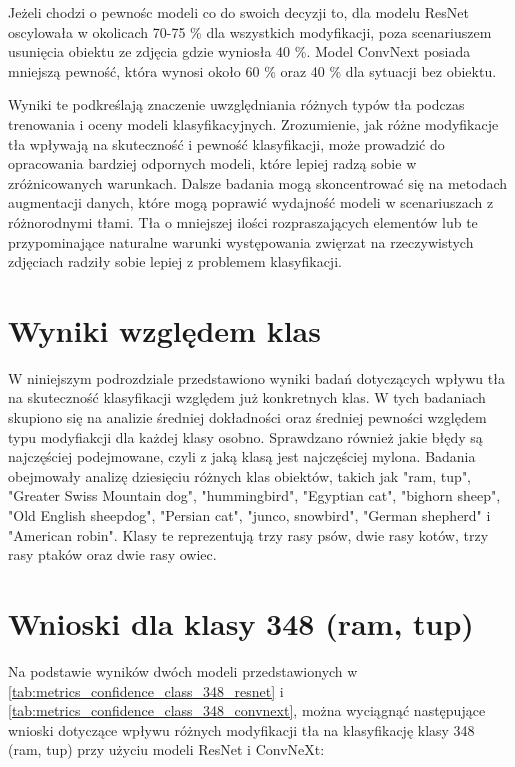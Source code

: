 Jeżeli chodzi o pewnośc modeli co do swoich decyzji to, dla modelu ResNet oscylowała w okolicach 70-75 \% dla wszystkich modyfikacji, poza scenariuszem usunięcia obiektu ze zdjęcia gdzie wyniosła 40 \%. Model ConvNext posiada mniejszą pewność, która wynosi około 60 \% oraz 40 \% dla 
sytuacji bez obiektu.

Wyniki te podkreślają znaczenie uwzględniania różnych typów tła podczas trenowania i oceny modeli klasyfikacyjnych. Zrozumienie, jak różne modyfikacje tła wpływają na skuteczność i pewność klasyfikacji, może prowadzić do opracowania bardziej odpornych modeli, które lepiej radzą 
sobie w zróżnicowanych warunkach. Dalsze badania mogą skoncentrować się na metodach augmentacji danych, które mogą poprawić wydajność modeli w scenariuszach z różnorodnymi tłami. Tła o mniejszej ilości rozpraszających elementów lub te przypominające naturalne warunki występowania zwięrzat
na rzeczywistych zdjęciach radziły sobie lepiej z problemem klasyfikacji. 

\section*{Wyniki względem klas}

W niniejszym podrozdziale przedstawiono wyniki badań dotyczących wpływu tła na skuteczność klasyfikacji względem już konkretnych klas. W tych badaniach skupiono się na analizie średniej dokładności oraz średniej pewności względem typu modyfiakcji dla każdej klasy osobno. Sprawdzano 
również jakie błędy są najczęściej podejmowane, czyli z jaką klasą jest najczęściej mylona. Badania obejmowały analizę dziesięciu różnych klas obiektów, takich jak "ram, tup", "Greater Swiss Mountain dog", "hummingbird", "Egyptian cat", "bighorn sheep", "Old English sheepdog", 
"Persian cat", "junco, snowbird", "German shepherd" i "American robin". Klasy te reprezentują trzy rasy psów, dwie rasy kotów, trzy rasy ptaków oraz dwie rasy owiec. 

\section*{Wnioski dla klasy 348 (ram, tup)}

Na podstawie wyników dwóch modeli przedstawionych w \ref*{tab:metrics_confidence_class_348_resnet} i \ref*{tab:metrics_confidence_class_348_convnext}, można wyciągnąć następujące wnioski dotyczące wpływu różnych 
modyfikacji tła na klasyfikację klasy 348 (ram, tup) przy użyciu modeli ResNet i ConvNeXt:

